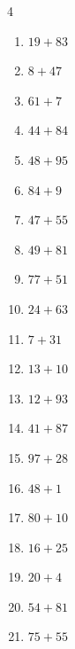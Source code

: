 \begin{multicols}{4}
\begin{enumerate}
  \item $19+83$
        \phantom{$=102$}

  \item $8+47$
        \phantom{$=55$}

  \item $61+7$
        \phantom{$=68$}

  \item $44+84$
        \phantom{$=128$}

  \item $48+95$
        \phantom{$=143$}

  \item $84+9$
        \phantom{$=93$}

  \item $47+55$
        \phantom{$=102$}

  \item $49+81$
        \phantom{$=130$}

  \item $77+51$
        \phantom{$=128$}

\columnbreak %

  \item $24+63$
        \phantom{$=87$}

  \item $7+31$
        \phantom{$=38$}

  \item $13+10$
        \phantom{$=23$}

  \item $12+93$
        \phantom{$=105$}

  \item $41+87$
        \phantom{$=128$}

  \item $97+28$
        \phantom{$=125$}

  \item $48+1$
        \phantom{$=49$}

  \item $80+10$
        \phantom{$=90$}

  \item $16+25$
        \phantom{$=41$}

  \item $20+4$
        \phantom{$=24$}

  \item $54+81$
        \phantom{$=135$}

  \item $75+55$
        \phantom{$=130$}


\end{enumerate}
\end{multicols}
